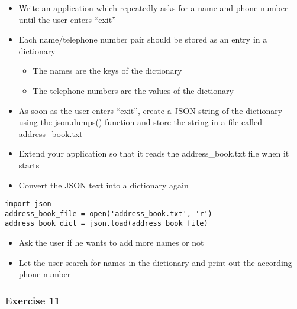 \documentclass[10pt, a4paper]{beamer} %
\begin{document}
{\begin{frame}
	\begin{itemize}
		\item Write an application which repeatedly asks for a name and phone
		      number until the user enters ``exit''
		\item Each name/telephone number pair should be stored as an entry in a dictionary
		      \begin{itemize}
			      \item The names are the keys of the dictionary
			      \item The telephone numbers are the values of the dictionary
		      \end{itemize}
		\item As soon as the user enters ``exit'', create a JSON string of the dictionary using the json.dumps() function and store the string in a file called address\_book.txt
	\end{itemize}

	\framebreak

	\begin{itemize}
		\item Extend your application so that it reads the address\_book.txt file when it starts
		\item Convert the JSON text into a dictionary again
	\end{itemize}

	{
	\mdseries
	\begin{lstlisting}
import json
address_book_file = open('address_book.txt', 'r')
address_book_dict = json.load(address_book_file)
\end{lstlisting}
	}

	\begin{itemize}
		\item Ask the user if he wants to add more names or not
		\item Let the user search for names in the dictionary and print out the according phone number
	\end{itemize}

\end{frame}

\begin{frame}\frametitle{Exercise 11}


\end{frame}}
\end{document}

